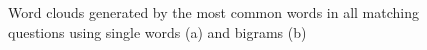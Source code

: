 \begin{figure}[t!]
  \centering
  \caption{Word clouds generated by the most common words in all matching questions using single words (a) and bigrams (b)}
  \label{fig:wcall}
\end{figure}

